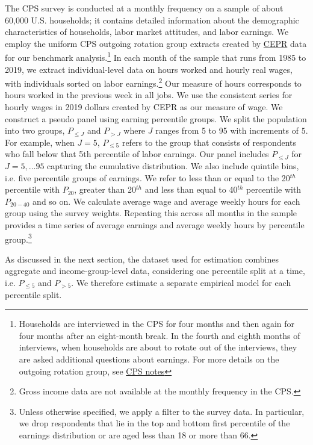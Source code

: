 \documentclass[a4paper,12pt]{article}%
\begin{document}
The CPS survey is conducted at a monthly frequency on a sample of about 60,000 U.S. households; it contains detailed information about the demographic characteristics of households, labor market attitudes, and labor earnings. We employ the uniform CPS outgoing rotation group extracts created by \href{https://ceprdata.org/}{CEPR} data for our benchmark analysis.\footnote{Households are interviewed in the CPS for four months and then again for four months after an eight-month break. In the fourth and eighth months of interviews, when households are about to rotate out of the interviews, they are asked additional questions about earnings. For more details on the outgoing rotation group, see 
\href{https://cps.ipums.org/cps/outgoing_rotation_notes.shtml}{CPS notes}}
 In each month of the sample that runs from 1985 to 2019, we extract individual-level data on hours worked and hourly real wages, with individuals sorted on labor earnings.\footnote{Gross income data are not available at the monthly frequency in the CPS.} 
Our measure of hours corresponds to hours worked in the previous week in all jobs. We use the consistent series for hourly wages in 2019 dollars created by CEPR  as our measure of wage.
We construct a pseudo panel using earning percentile groups. We split the population into two groups, $P_{\leq J}$ and $P_{>J}$ where $J$ ranges from 5 to 95 with increments of $5$. For example, when $J=5$, $ P_{\leq 5} $ refers to the group that consists of respondents who fall below that 5th percentile of labor earnings. Our panel includes $P_{\leq J}$ for $J=5,\dots 95$ capturing the cumulative distribution. We also include quintile bins, i.e. five percentile groups of earnings. We refer to less than or equal to the 20$^{th}$ percentile with $P_{20} $, greater than 20$^{th}$ and less than equal to 40$^{th}$ percentile with $  P_{20-40}$ and so on. 
We calculate average wage and average weekly hours for each group using the survey weights. Repeating this across all months in the sample provides a time series of average earnings and average weekly hours by percentile group.\footnote{Unless otherwise specified, we apply a filter to the survey data. In particular, we drop respondents that lie in the top and bottom first percentile of the earnings  distribution or are aged less than 18 or more than 66. }  

As discussed in the next section, the dataset used for estimation combines aggregate and income-group-level data, considering one percentile split at a time, i.e. $P_{\leq 5}$ and $P_{> 5}$. We therefore estimate a separate empirical model for each percentile split.
\end{document}
